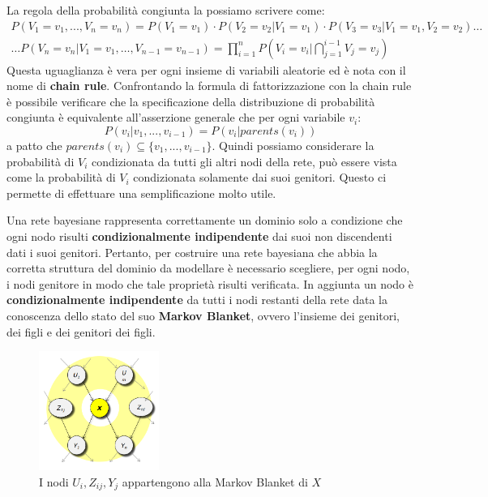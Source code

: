 La regola della probabilità congiunta la possiamo scrivere come:
\begin{equation*}
    \begin{aligned}
        P(V_1= v_1,...,V_n = v_n) = P(V_1 = v_1) \cdot P(V_2 = v_2|V_1 = v_1)
        \cdot P(V_3 = v_3|V_1 = v_1,V_2 = v_2) \dots \\
        \dots P(V_n = v_n|V_1 = v_1, \dots,V_{n-1}=v_{n-1}) = \prod_{i=1}^{n}
        P(V_i = v_i| \bigcap_{j = 1}^{i - 1} V_j= v_j)
    \end{aligned}
\end{equation*}
Questa uguaglianza è vera per ogni insieme di variabili aleatorie ed è nota con
il nome di \textbf{chain rule}. Confrontando la formula di fattorizzazione con
la chain rule è possibile verificare che la specificazione della distribuzione
di probabilità congiunta è equivalente all'asserzione generale che per ogni
variabile $v_i$:
\begin{equation}
    P(v_i|v_1,...,v_{i-1}) = P(v_i|parents(v_i))
\end{equation}
a patto che $parents(v_i) \subseteq \{v_1,...,v_{i-1}\}$. Quindi possiamo
considerare la probabilità di $V_i$ condizionata da tutti gli altri nodi della
rete, può essere vista come la probabilità di $V_i$ condizionata solamente dai
suoi genitori. Questo ci permette di effettuare una semplificazione molto utile.

Una rete bayesiane rappresenta correttamente un dominio solo a condizione che ogni
nodo risulti \textbf{condizionalmente indipendente} dai suoi non discendenti
dati i suoi genitori. Pertanto, per costruire una rete bayesiana che abbia la
corretta struttura del dominio da modellare è necessario scegliere, per ogni nodo,
i nodi genitore in modo che tale proprietà risulti verificata. In aggiunta un nodo
è \textbf{condizionalmente indipendente} da tutti i nodi restanti della rete data
la conoscenza dello stato del suo \textbf{Markov Blanket}, ovvero l'insieme dei
genitori, dei figli e dei genitori dei figli.
\begin{figure}[!ht]
    \centering
    \includegraphics[width=0.35\textwidth]{./img/Reti/MarkovBlanket.png}
    \caption{I nodi $U_i, Z_{ij}, Y_j$ appartengono alla Markov Blanket di $X$}
    \label{fig:MarkovBlanket}
\end{figure}

